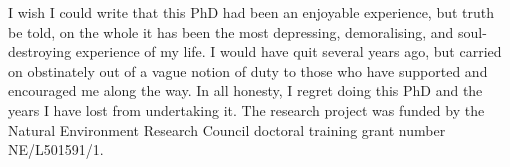 I wish I could write that this PhD had been an enjoyable experience, but truth be told, on the whole it has been the most depressing, demoralising, and soul-destroying experience of my life. I would have quit several years ago, but carried on obstinately out of a vague notion of duty to those who have supported and encouraged me along the way. In all honesty, I regret doing this PhD and the years I have lost from undertaking it.
The research project was funded by the Natural Environment Research Council doctoral training grant number NE/L501591/1.
\afterpreface
